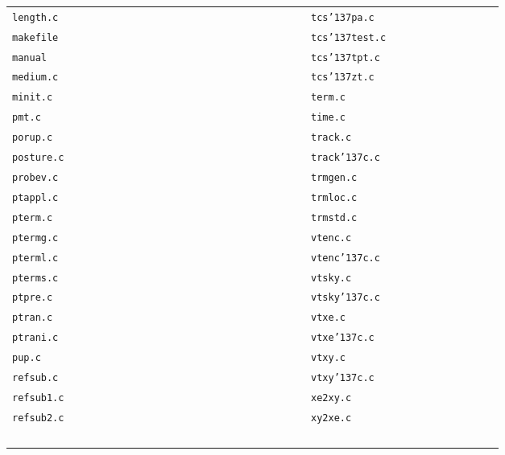 \documentclass[12pt,fleqn,twoside]{article}
\renewcommand{\_}{{\tt\char'137}}     %
\begin{document}
\begin{center}
\begin{tabular}{lrclr}
{\tt length.c    } & \pageref{tptLength}  & & {\tt tcs\_pa.c   } & \pageref{tcs_pa}      \\
{\tt makefile    } & \pageref{makefile}   & & {\tt tcs\_test.c } & \pageref{tcs_test}    \\
{\tt manual      } & \pageref{manual}     & & {\tt tcs\_tpt.c  } & \pageref{tcs_tpt}     \\
{\tt medium.c    } & \pageref{tcsMedium}  & & {\tt tcs\_zt.c   } & \pageref{tcs_zt}      \\
{\tt minit.c     } & \pageref{tptMinit}   & & {\tt term.c      } & \pageref{tptTerm}     \\
{\tt pmt.c       } & \pageref{tcsPmt}     & & {\tt time.c      } & \pageref{tcsTime}     \\
{\tt porup.c     } & \pageref{tcsPorup}   & & {\tt track.c     } & \pageref{tcsTrack}    \\
{\tt posture.c   } & \pageref{tcsPosture} & & {\tt track\_c.c  } & \pageref{tcsTrack_c}  \\
{\tt probev.c    } & \pageref{tcsProbev}  & & {\tt trmgen.c    } & \pageref{tptTrmgen}   \\
{\tt ptappl.c    } & \pageref{tptPtappl}  & & {\tt trmloc.c    } & \pageref{tptTrmloc}   \\
{\tt pterm.c     } & \pageref{tptPterm}   & & {\tt trmstd.c    } & \pageref{tptTrmstd}   \\
{\tt ptermg.c    } & \pageref{tptPtermg}  & & {\tt vtenc.c     } & \pageref{tcsVTenc}    \\
{\tt pterml.c    } & \pageref{tptPterml}  & & {\tt vtenc\_c.c  } & \pageref{tcsVTenc_c}  \\
{\tt pterms.c    } & \pageref{tptPterms}  & & {\tt vtsky.c     } & \pageref{tcsVTsky}    \\
{\tt ptpre.c     } & \pageref{tptPtpre}   & & {\tt vtsky\_c.c  } & \pageref{tcsVTsky_c}  \\
{\tt ptran.c     } & \pageref{tcsPtran}   & & {\tt vtxe.c      } & \pageref{tcsVTxe}     \\
{\tt ptrani.c    } & \pageref{tcsPtrani}  & & {\tt vtxe\_c.c   } & \pageref{tcsVTxe_c}   \\
{\tt pup.c       } & \pageref{tcsPup}     & & {\tt vtxy.c      } & \pageref{tcsVTxy}     \\
{\tt refsub.c    } & \pageref{refsub}     & & {\tt vtxy\_c.c   } & \pageref{tcsVTxy_c}   \\
{\tt refsub1.c   } & \pageref{tcsRefsub}  & & {\tt xe2xy.c     } & \pageref{tcsXe2xy}    \\
{\tt refsub2.c   } & \pageref{dsaRefsub}  & & {\tt xy2xe.c     } & \pageref{tcsXy2xe}    \\
~~~~~~~~~~~~~~   &  ~~~~~~~~~~~~~~~~  & ~~~~~~~~~~~~~~~~~  & ~~~~~~~~~~~~~~   &  ~~~~~~~~~~~~~~~~ \\
\end{tabular}
\end{center}
\vfill
\fi
\end{document}
